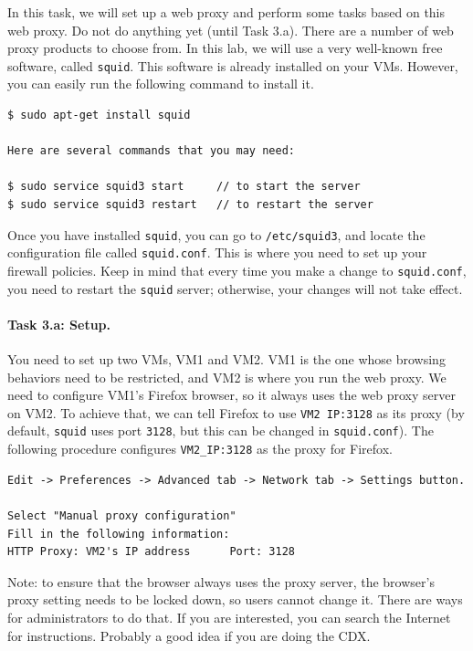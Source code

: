 In this task, we will set up a web proxy and perform some 
tasks based on this web proxy. Do not do anything yet (until Task 3.a). There are a number of 
web proxy products to choose from. In this lab, we will 
use a very well-known free software, called {\tt squid}. This software is already installed on your VMs. 
However, you can easily run the following command to 
install it.\\
\begin{Verbatim}[frame=single] 
$ sudo apt-get install squid

Here are several commands that you may need:

$ sudo service squid3 start     // to start the server
$ sudo service squid3 restart   // to restart the server
\end{Verbatim}


Once you have installed {\tt squid}, you can go to {\tt /etc/squid3},
and locate the configuration file called {\tt squid.conf}. This is 
where you need to set up your firewall policies. Keep in mind that 
every time you make a change to {\tt squid.conf}, you need to 
restart the {\tt squid} server; otherwise, your changes will 
not take effect.


\paragraph{Task 3.a: Setup.} You need to set up two VMs, VM1 
and VM2. VM1 is the one whose browsing behaviors need to be restricted,
and VM2 is where you run the web proxy. We need to configure
VM1's Firefox browser, so it always uses the web proxy server on VM2.
To achieve that, we can tell Firefox to
use {\tt VM2 IP:3128} as its proxy (by default, {\tt squid} uses 
port {\tt 3128}, but this can be changed in {\tt squid.conf}).
The following procedure
configures {\tt VM2\_IP:3128} as the proxy for Firefox.
\begin{Verbatim}[frame=single] 
Edit -> Preferences -> Advanced tab -> Network tab -> Settings button.

Select "Manual proxy configuration"
Fill in the following information:
HTTP Proxy: VM2's IP address      Port: 3128
\end{Verbatim}

Note: to ensure that the browser always uses the proxy server, 
the browser's proxy setting needs to be locked down, so users cannot 
change it. There are ways for administrators to do that. If you are 
interested, you can search the Internet for instructions. Probably a good idea if you are doing the CDX.\\


